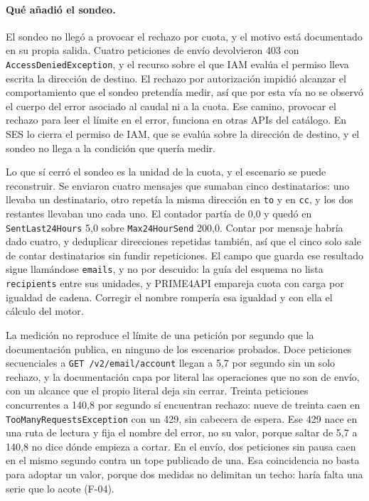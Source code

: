 \paragraph{Qué añadió el sondeo.} El sondeo no llegó a provocar el rechazo
por cuota, y el motivo está documentado en su propia salida. Cuatro peticiones
de envío devolvieron 403 con \texttt{AccessDenied\allowbreak Exception}, y el
recurso sobre el que IAM evalúa el permiso lleva escrita la dirección de
destino. El rechazo por autorización impidió alcanzar el comportamiento que el
sondeo pretendía medir, así que por esta vía no se observó el cuerpo del error
asociado al caudal ni a la cuota. Ese camino, provocar el rechazo para leer el
límite en el error, funciona en otras APIs del catálogo. En SES lo cierra el
permiso de IAM, que se evalúa sobre la dirección de destino, y el sondeo no
llega a la condición que quería medir.

Lo que sí cerró el sondeo es la unidad de la cuota, y el escenario se puede
reconstruir. Se enviaron cuatro mensajes que sumaban cinco destinatarios: uno
llevaba un destinatario, otro repetía la misma dirección en \texttt{to} y en
\texttt{cc}, y los dos restantes llevaban uno cada uno. El contador partía de
0,0 y quedó en \texttt{SentLast24Hours} 5,0 sobre \texttt{Max24HourSend}
200,0. Contar por mensaje habría dado cuatro, y deduplicar direcciones
repetidas también, así que el cinco solo sale de contar destinatarios sin
fundir repeticiones. El campo que guarda ese resultado sigue llamándose
\texttt{emails}, y no por descuido: la guía del esquema no lista
\texttt{recipients} entre sus unidades, y PRIME4API empareja cuota con carga
por igualdad de cadena. Corregir el nombre rompería esa igualdad y con ella el
cálculo del motor.

La medición no reproduce el límite de una petición por segundo que la
documentación publica, en ninguno de los escenarios probados. Doce peticiones
secuenciales a \texttt{GET /v2/email/\allowbreak account} llegan a 5,7 por
segundo sin un solo rechazo, y la documentación capa por literal las
operaciones que no son de envío, con un alcance que el propio literal deja sin
cerrar. Treinta peticiones concurrentes a 140,8 por segundo sí encuentran
rechazo: nueve de treinta caen en \texttt{TooManyRequestsException} con un
429, sin cabecera de espera. Ese 429 nace en una ruta de lectura y fija el
nombre del error, no su valor, porque saltar de 5,7 a 140,8 no dice dónde
empieza a cortar. En el envío, dos peticiones sin pausa caen en el mismo
segundo contra un tope publicado de una. Esa coincidencia no basta para
adoptar un valor, porque dos medidas no delimitan un techo: haría falta una
serie que lo acote (F-04).

